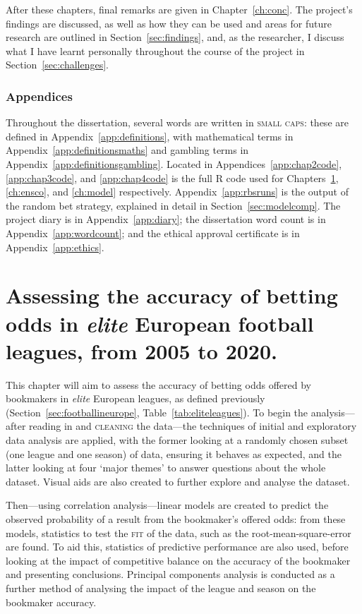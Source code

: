 \documentclass[a4paper,10pt]{report}
\begin{document}
After these chapters, final remarks are given in Chapter~\ref{ch:conc}. The project's findings are discussed, as well as how they can be used and areas for future research are outlined in Section~\ref{sec:findings}, and, as the researcher, I discuss what I have learnt personally throughout the course of the project in Section~\ref{sec:challenges}. 

\subsection*{Appendices}
Throughout the dissertation, several words are written in \textsc{small caps}: these are defined in Appendix~\ref{app:definitions}, with mathematical terms in Appendix~\ref{app:definitionsmaths} and gambling terms in Appendix~\ref{app:definitionsgambling}. Located in Appendices~\ref{app:chap2code}, \ref{app:chap3code}, and \ref{app:chap4code} is the full R code used for Chapters~\ref{ch:elite}, \ref{ch:ensco}, and \ref{ch:model} respectively. Appendix~\ref{app:rbsruns} is the output of the random bet strategy, explained in detail in Section~\ref{sec:modelcomp}. The project diary is in Appendix~\ref{app:diary}; the dissertation word count is in Appendix~\ref{app:wordcount}; and the ethical approval certificate is in Appendix~\ref{app:ethics}.


\chapter[\textit{Elite} European Leagues, 2005--20]{Assessing the accuracy of betting odds in \textit{elite} European football leagues, from 2005 to 2020.}\label{ch:elite}

This chapter will aim to assess the accuracy of betting odds offered by bookmakers in \textit{elite} European leagues, as defined previously (Section~\ref{sec:footballineurope}, Table~\ref{tab:eliteleagues}). To begin the analysis---after reading in and \textsc{cleaning} the data---the techniques of initial and exploratory data analysis are applied, with the former looking at a randomly chosen subset (one league and one season) of data, ensuring it behaves as expected, and the latter looking at four `major themes' \autocite{Hoaglin77} to answer questions about the whole dataset. Visual aids are also created to further explore and analyse the dataset.

Then---using correlation analysis---linear models are created to predict the observed probability of a result from the bookmaker's offered odds: from these models, statistics to test the \textsc{fit} of the data, such as the root-mean-square-error are found. To aid this, statistics of predictive performance are also used, before looking at the impact of competitive balance on the accuracy of the bookmaker and presenting conclusions. Principal components analysis is conducted as a further method of analysing the impact of the league and season on the bookmaker accuracy. 
\end{document}
